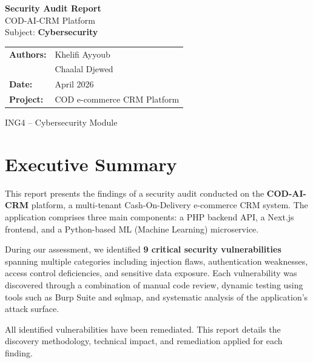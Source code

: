 \documentclass[12pt,a4paper]{article}
\begin{document}
\begin{titlepage}
\centering
\vspace*{2cm}

{\Huge\bfseries Security Audit Report}\\[0.5cm]
{\LARGE COD-AI-CRM Platform}\\[1.5cm]

{\Large Subject: \textbf{Cybersecurity}}\\[2cm]

\begin{tabular}{ll}
\textbf{Authors:} & Khelifi Ayyoub \\
                   & Chaalal Djewed \\[0.5cm]
\textbf{Date:}    & April 2026 \\[0.5cm]
\textbf{Project:} & COD e-commerce CRM Platform \\[0.5cm]
\end{tabular}

\vfill

{\large ING4 -- Cybersecurity Module}

\end{titlepage}

\tableofcontents
\newpage

\section{Executive Summary}

This report presents the findings of a security audit conducted on the \textbf{COD-AI-CRM} platform, a multi-tenant Cash-On-Delivery e-commerce CRM system. The application comprises three main components: a PHP backend API, a Next.js frontend, and a Python-based ML (Machine Learning) microservice.

During our assessment, we identified \textbf{9 critical security vulnerabilities} spanning multiple categories including injection flaws, authentication weaknesses, access control deficiencies, and sensitive data exposure. Each vulnerability was discovered through a combination of manual code review, dynamic testing using tools such as Burp Suite and sqlmap, and systematic analysis of the application's attack surface.

All identified vulnerabilities have been remediated. This report details the discovery methodology, technical impact, and remediation applied for each finding.
\end{document}
